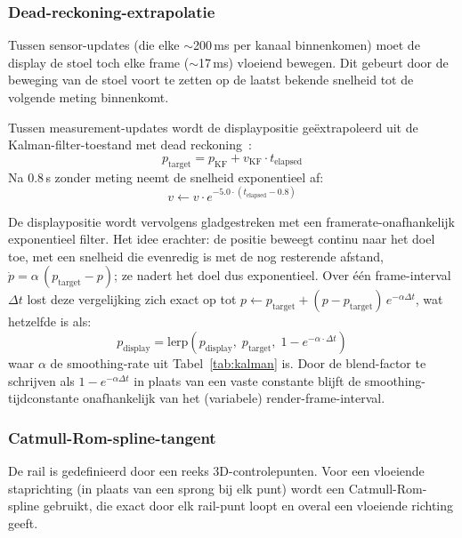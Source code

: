 \documentclass[10pt, a4paper, twocolumn]{article}
\begin{document}
\subsubsection{Dead-reckoning-extrapolatie}
Tussen sensor-updates (die elke $\sim$200\,ms per kanaal binnenkomen) moet de
display de stoel toch elke frame ($\sim$17\,ms) vloeiend bewegen. Dit gebeurt
door de beweging van de stoel voort te zetten op de laatst bekende snelheid tot
de volgende meting binnenkomt.

Tussen measurement-updates wordt de displaypositie geëxtrapoleerd uit de
Kalman-filter-toestand met dead reckoning~\cite{bowditch2002}:
\begin{equation}
\label{eq:deadreckon}
p_{\text{target}} = p_{\text{KF}} + v_{\text{KF}} \cdot t_{\text{elapsed}}
\end{equation}
Na 0.8\,s zonder meting neemt de snelheid exponentieel af:
\begin{equation}
\label{eq:veldecay}
v \leftarrow v \cdot e^{-5.0 \cdot (t_{\text{elapsed}} - 0.8)}
\end{equation}

De displaypositie wordt vervolgens gladgestreken met een
framerate-onafhankelijk exponentieel filter. Het idee erachter: de positie
beweegt continu naar het doel toe, met een snelheid die evenredig is met de nog
resterende afstand, $\dot{p} = \alpha\,(p_{\text{target}} - p)$; ze nadert het
doel dus exponentieel. Over één frame-interval $\Delta t$ lost deze vergelijking
zich exact op tot
$p \leftarrow p_{\text{target}} + (p - p_{\text{target}})\,e^{-\alpha\Delta t}$,
wat hetzelfde is als:
\begin{equation}
\label{eq:displaysmooth}
p_{\text{display}} = \text{lerp}(p_{\text{display}},\; p_{\text{target}},\; 1 - e^{-\alpha \cdot \Delta t})
\end{equation}
waar $\alpha$ de smoothing-rate uit Tabel~\ref{tab:kalman} is. Door de
blend-factor te schrijven als $1 - e^{-\alpha\Delta t}$ in plaats van een vaste
constante blijft de smoothing-tijdconstante onafhankelijk van het (variabele)
render-frame-interval.

\subsubsection{Catmull-Rom-spline-tangent}
De rail is gedefinieerd door een reeks 3D-controlepunten. Voor een vloeiende
staprichting (in plaats van een sprong bij elk punt) wordt een Catmull-Rom-spline
gebruikt, die exact door elk rail-punt loopt en overal een vloeiende richting geeft.
\end{document}
